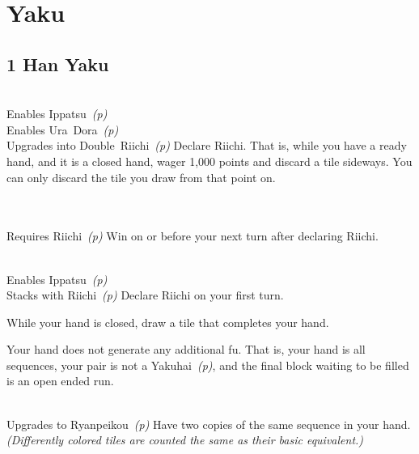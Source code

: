 \section{Yaku}\label{core:sec:yaku}

\subsection{1 Han Yaku}\label{core:ssec:1-han-yaku}

	{\closedhand \\ 
	\upgradesto Enables Ippatsu~\textit{(p\pageref{core:yaku:Ippatsu})} \\ 
	\upgradestoother Enables Ura~Dora~\textit{(p\pageref{core:bonus:Ura Dora})} \\ 
	\upgradesto Upgrades into Double~Riichi~\textit{(p\pageref{core:yaku:Double Riichi})}}
	{Declare Riichi. That is, while you have a ready hand, and it is a closed hand, wager 1,000 points and discard a tile sideways. You can only discard the tile you draw from that point on.}

	{\closedhand \\ 
	\brokenhand \\
	\upgradesfrom Requires Riichi~\textit{(p\pageref{core:yaku:Riichi})}}
	{Win on or before your next turn after declaring Riichi.}

	{\closedhand \\ 
	\upgradesto Enables Ippatsu~\textit{(p\pageref{core:yaku:Ippatsu})} \\ 
	\upgradesfrom Stacks with Riichi~\textit{(p\pageref{core:yaku:Riichi})}}
	{Declare Riichi on your first turn.}

	{\closedhand}
	{While your hand is closed, draw a tile that completes your hand.}

	{\closedhand}
	{Your hand does not generate any additional fu. That is, your hand is all sequences, your pair is not a Yakuhai~\textit{(p\pageref{core:yaku:Yakuhai})}, and the final block waiting to be filled is an open ended run.}

	{\closedhand \\
	\upgradesto Upgrades to Ryanpeikou~\textit{(p\pageref{core:yaku:Ryanpeikou})}}
	{Have two copies of the same sequence in your hand. \textit{(Differently colored tiles are counted the same as their basic equivalent.)}}

